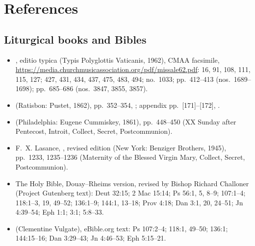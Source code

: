 \section*{References}
\label{sec:references}

{\footnotesize
\subsection*{Liturgical books and Bibles}
\begin{itemize}
\item {}, editio typica (Typis Polyglottis Vaticanis, 1962), CMAA facsimile, \url{https://media.churchmusicassociation.org/pdf/missale62.pdf}:  16, 91, 108, 111, 115, 127;  427, 431, 434, 437, 475, 483, 494;  no.~1033; pp.~412--413 (nos.~1689--1698); pp.~685--686 (nos.~3847, 3855, 3857).
\item {} (Ratisbon: Pustet, 1862), pp.~352--354, ; appendix pp.~[171]--[172], .
\item {} (Philadelphia: Eugene Cummiskey, 1861), pp.~448--450 (XX Sunday after Pentecost, Introit, Collect, Secret, Postcommunion).
\item F.~X. Lasance, , revised edition (New York: Benziger Brothers, 1945), pp.~1233, 1235--1236 (Maternity of the Blessed Virgin Mary, Collect, Secret, Postcommunion).
\item The Holy Bible, Douay--Rheims version, revised by Bishop Richard Challoner (Project Gutenberg text): Deut 32:15; 2 Mac 15:14; Ps 56:1, 5, 8--9; 107:1--4; 118:1--3, 19, 49--52; 136:1--9; 144:1, 13--18; Prov 4:18; Dan 3:1, 20, 24--51; Jn 4:39--54; Eph 1:1; 3:1; 5:8--33.
\item {} (Clementine Vulgate), eBible.org text: Ps 107:2--4; 118:1, 49--50; 136:1; 144:15--16; Dan 3:29--43; Jn 4:46--53; Eph 5:15--21.
\end{itemize}

}
